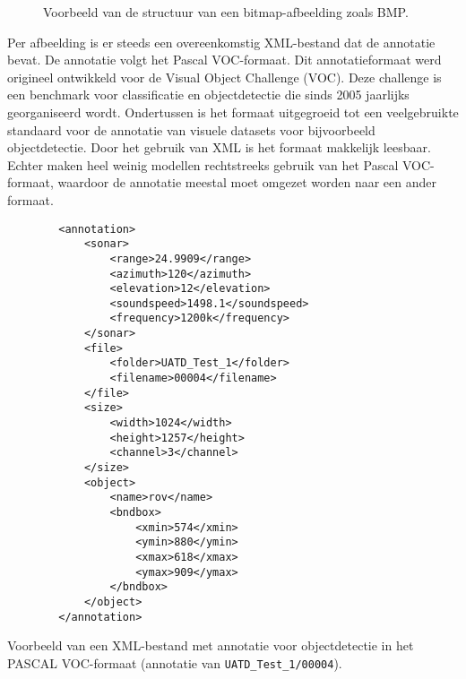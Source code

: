 \begin{figure}[H]
    \caption[Voorbeeld van een bitmap.]{\label{fig:bitmap_example_image}Voorbeeld van de structuur van een bitmap-afbeelding zoals BMP.}
\end{figure}

Per afbeelding is er steeds een overeenkomstig XML-bestand dat de annotatie bevat. De annotatie volgt het Pascal VOC-formaat. Dit annotatieformaat werd origineel ontwikkeld voor de Visual Object Challenge (VOC). Deze challenge is een benchmark voor classificatie en objectdetectie die sinds 2005 jaarlijks georganiseerd wordt. Ondertussen is het formaat uitgegroeid tot een veelgebruikte standaard voor de annotatie van visuele datasets voor bijvoorbeeld objectdetectie. Door het gebruik van XML is het formaat makkelijk leesbaar. Echter maken heel weinig modellen rechtstreeks gebruik van het Pascal VOC-formaat, waardoor de annotatie meestal moet omgezet worden naar een ander formaat. \autocite{Everingham_2009}

\clearpage

\begin{listing}[H]
    \begin{verbatim}
        <annotation>
            <sonar>
                <range>24.9909</range>
                <azimuth>120</azimuth>
                <elevation>12</elevation>
                <soundspeed>1498.1</soundspeed>
                <frequency>1200k</frequency>
            </sonar>
            <file>
                <folder>UATD_Test_1</folder>
                <filename>00004</filename>
            </file>
            <size>
                <width>1024</width>
                <height>1257</height>
                <channel>3</channel>
            </size>
            <object>
                <name>rov</name>
                <bndbox>
                    <xmin>574</xmin>
                    <ymin>880</ymin>
                    <xmax>618</xmax>
                    <ymax>909</ymax>
                </bndbox>
            </object>
        </annotation>
    \end{verbatim}
    \caption[PASCAL VOC-annotatie]{Voorbeeld van een XML-bestand met annotatie voor objectdetectie in het PASCAL VOC-formaat (annotatie van \texttt{UATD\_Test\_1/00004}). \autocite{Xie_2022}}
\end{listing}

